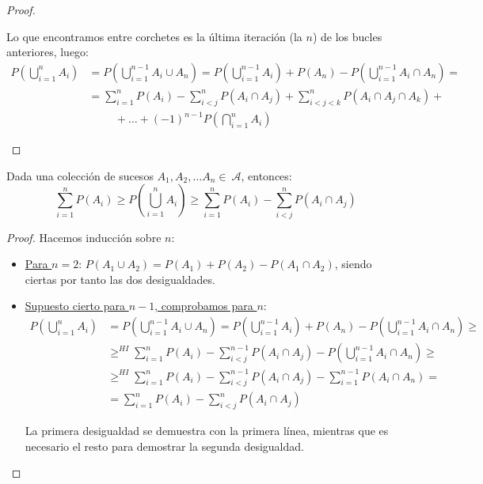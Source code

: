 \begin{proof}
\begin{itemize}
      Lo que encontramos entre corchetes es la última iteración (la $n$) de los bucles anteriores, luego:
      \begin{equation*}\begin{split}
          P\left(\bigcup_{i=1}^nA_i\right)
          &= P\left(\bigcup_{i=1}^{n-1}A_i \cup A_n\right)
          = P\left(\bigcup_{i=1}^{n-1}A_i\right) + P(A_n) - P\left(\bigcup_{i=1}^{n-1}A_i \cap A_n\right)
          =\\& =
          \sum_{i=1}^{n} P(A_i) - \sum_{i<j}^{n} P(A_i \cap A_j) + \sum_{i<j<k}^{n} P(A_i \cap A_j \cap A_k) + \\ &\hspace{1cm}
          + \ldots + (-1)^{n-1} P\left(\bigcap_{i=1}^{n} A_i\right)
      \end{split}\end{equation*}
  \end{itemize}
\end{proof}

\begin{prop}
    Dada una colección de sucesos $A_1, A_2, \ldots A_n\in~\mathcal{A}$, entonces:
      $$\sum_{i=1}^n P(A_i) \geq P\left(\bigcup_{i=1}^n A_i\right) \geq \sum_{i=1}^n P(A_i) - \sum_{i<j}^n P(A_i \cap A_j)$$
\end{prop}
\begin{proof}
    Hacemos inducción sobre $n$:
    \begin{itemize}
        \item \underline{Para $n=2$}:
        $P(A_1 \cup A_2) = P(A_1) + P(A_2) - P(A_1 \cap A_2)$, siendo ciertas por tanto las dos desigualdades.

        \item \underline{Supuesto cierto para $n-1$, comprobamos para $n$}:
        \begin{equation*}\begin{split}
            P\left(\bigcup_{i=1}^n A_i\right) 
            &= P\left(\bigcup_{i=1}^{n-1}A_i \cup A_n\right) = P\left(\bigcup_{i=1}^{n-1}A_i\right) + P(A_n) - P\left(\bigcup_{i=1}^{n-1} A_i \cap A_n\right)
            \geq \\ &
            \mathop{\geq}^{HI} \sum_{i=1}^n P(A_i) - \sum_{i<j}^{n-1}P(A_i \cap A_j) - P\left(\bigcup_{i=1}^{n-1} A_i \cap A_n\right)
            \geq \\ &
            \mathop{\geq}^{HI} \sum_{i=1}^n P(A_i) - \sum_{i<j}^{n-1}P(A_i \cap A_j) - \sum_{i=1}^{n-1}P(A_i \cap A_n)
            = \\ &=
            \sum_{i=1}^n P(A_i) - \sum_{i<j}^n P(A_i \cap A_j)
        \end{split}\end{equation*}

        La primera desigualdad se demuestra con la primera línea, mientras que es necesario el resto para demostrar la segunda desigualdad.
    \end{itemize}
\end{proof}

